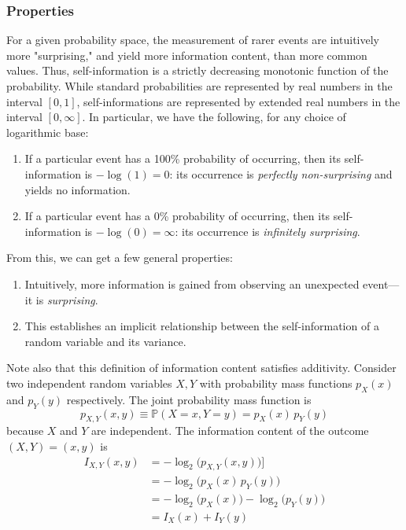 \documentclass{article}
\begin{document}
  \subsubsection{Properties}
  For a given probability space, the measurement of rarer events are intuitively more "surprising," and yield more information content, than more common values. Thus, self-information is a strictly decreasing monotonic function of the probability. While standard probabilities are represented by real numbers in the interval $[0,1]$, self-informations are represented by extended real numbers in the interval $[0,\infty]$. In particular, we have the following, for any choice of logarithmic base:
  \begin{enumerate}
      \item If a particular event has a 100\% probability of occurring, then its self-information is $-\log (1) = 0$: its occurrence is \textit{perfectly non-surprising} and yields no information.
      \item If a particular event has a 0\% probability of occurring, then its self-information is $- \log (0) = \infty$: its occurrence is \textit{infinitely surprising}.
  \end{enumerate}
  From this, we can get a few general properties: 
  \begin{enumerate}
      \item Intuitively, more information is gained from observing an unexpected event—it is \textit{surprising}.
      \item This establishes an implicit relationship between the self-information of a random variable and its variance. 
  \end{enumerate}
  Note also that this definition of information content satisfies additivity. Consider two independent random variables $X, Y$ with probability mass functions $p_X (x)$ and $p_Y (y)$ respectively. The joint probability mass function is 
  \[p_{X, Y} (x, y) \equiv \mathbb{P} (X = x, Y = y) = p_X (x) \, p_Y (y)\]
  because $X$ and $Y$ are independent. The information content of the outcome $(X, Y) = (x, y)$ is 
  \begin{align*}
      I_{X, Y} (x, y) & = - \log_2 \big( p_{X, Y} (x, y) \big) ]\\
      & = -\log_2 \big(p_X (x) \, p_Y (y)\big) \\
      & = - \log_2 \big( p_X (x) \big) - \log_2 \big( p_Y (y) \big) \\
      & = I_X (x) + I_Y (y)
  \end{align*}
\end{document}
